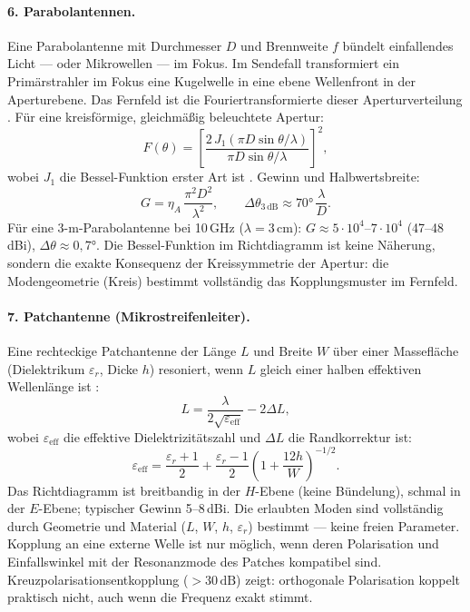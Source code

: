 \paragraph{6. Parabolantennen.}

Eine Parabolantenne mit Durchmesser $D$ und Brennweite $f$ bündelt einfallendes
Licht --- oder Mikrowellen --- im Fokus. Im Sendefall transformiert ein
Primärstrahler im Fokus eine Kugelwelle in eine ebene Wellenfront in der
Aperturebene. Das Fernfeld ist die Fouriertransformierte dieser Aperturverteilung
\EM. Für eine kreisförmige, gleichmäßig beleuchtete Apertur:
\[
  F(\theta) = \left[\frac{2\,J_1(\pi D\sin\theta/\lambda)}
                        {\pi D\sin\theta/\lambda}\right]^2,
\]
wobei $J_1$ die Bessel-Funktion erster Art ist \cite{Balanis2016}. Gewinn und Halbwertsbreite:
\[
  G = \eta_A\,\frac{\pi^2 D^2}{\lambda^2}, \qquad
  \Delta\theta_{3\,\mathrm{dB}} \approx 70°\,\frac{\lambda}{D}.
\]
Für eine 3-m-Parabolantenne bei 10\,GHz ($\lambda = 3\,\mathrm{cm}$):
$G \approx 5\cdot10^4$--$7\cdot10^4$ (47--48\,dBi), $\Delta\theta \approx 0{,}7°$. Die Bessel-Funktion
im Richtdiagramm ist keine Näherung, sondern die exakte Konsequenz der
Kreissymmetrie der Apertur: die Modengeometrie (Kreis) bestimmt vollständig
das Kopplungsmuster im Fernfeld.

\paragraph{7. Patchantenne (Mikrostreifenleiter).}

Eine rechteckige Patchantenne der Länge $L$ und Breite $W$ über einer
Massefläche (Dielektrikum $\varepsilon_r$, Dicke $h$) resoniert, wenn
$L$ gleich einer halben effektiven Wellenlänge ist \cite{Pozar2012,Balanis2016}:
\[
  L = \frac{\lambda}{2\sqrt{\varepsilon_\mathrm{eff}}} - 2\Delta L,
\]
wobei $\varepsilon_\mathrm{eff}$ die effektive Dielektrizitätszahl und
$\Delta L$ die Randkorrektur ist:
\[
  \varepsilon_\mathrm{eff} = \frac{\varepsilon_r+1}{2}
    + \frac{\varepsilon_r-1}{2}\left(1 + \frac{12h}{W}\right)^{-1/2}.
\]
Das Richtdiagramm ist breitbandig in der $H$-Ebene (keine Bündelung), schmal
in der $E$-Ebene; typischer Gewinn 5--8\,dBi. Die erlaubten Moden sind
vollständig durch Geometrie und Material ($L$, $W$, $h$, $\varepsilon_r$)
bestimmt --- keine freien Parameter. Kopplung an eine externe Welle ist nur
möglich, wenn deren Polarisation und Einfallswinkel mit der Resonanzmode
des Patches kompatibel sind. Kreuzpolarisationsentkopplung ($> 30\,\mathrm{dB}$)
zeigt: orthogonale Polarisation koppelt praktisch nicht, auch wenn die
Frequenz exakt stimmt.

